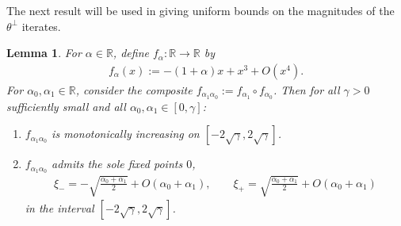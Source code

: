 \documentclass{article}
\newcommand{\RB}{\mathbb{R}}
\newcommand{\tpe}{\theta^{\perp}}
\theoremstyle{plain}
\newtheorem{lemma}[theorem]{Lemma}
\theoremstyle{definition}
\theoremstyle{remark}
\begin{document}
The next result will be used in giving uniform bounds on the magnitudes of the $\tpe$ iterates.

\begin{lemma}\label{lem:contraction1}
    For $\alpha\in\RB$, define $f_{\alpha}:\RB\rightarrow\RB$ by
    \begin{align}
        f_{\alpha}(x):=-(1+\alpha)x+x^3+O(x^4).
    \end{align}
    For $\alpha_0,\alpha_1\in\RB$, consider the composite $f_{\alpha_1\alpha_0}:=f_{\alpha_1}\circ f_{\alpha_0}$. Then for all $\gamma>0$ sufficiently small and all $\alpha_0,\alpha_1\in[0,\gamma]$:
    \begin{enumerate}
        \item $f_{\alpha_1\alpha_0}$ is monotonically increasing on $[-2\sqrt{\gamma},2\sqrt{\gamma}]$.
        \item $f_{\alpha_1\alpha_0}$ admits the sole fixed points $0$,
        \begin{align}
            \xi_- = -\sqrt{\frac{\alpha_0+\alpha_1}{2}} + O(\alpha_0+\alpha_1),\qquad \xi_+ = \sqrt{\frac{\alpha_0+\alpha_1}{2}} + O(\alpha_0+\alpha_1)
        \end{align}
        in the interval $[-2\sqrt{\gamma},2\sqrt{\gamma}]$.
    \end{enumerate}
\end{lemma}
\end{document}
